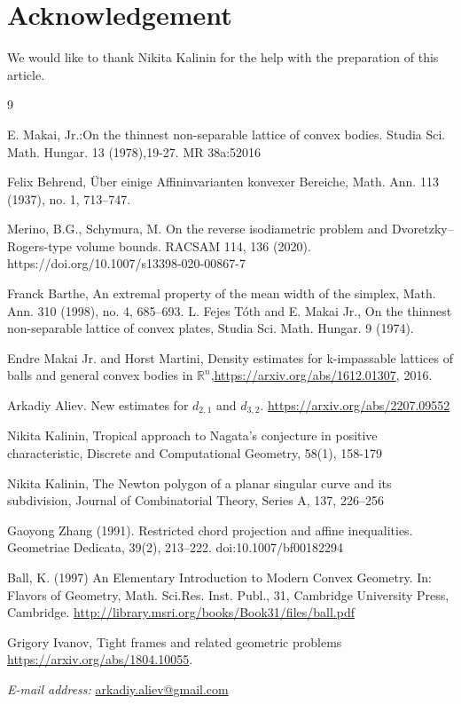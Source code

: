 \documentclass[12pt]{article}
\begin{document}
\section*{Acknowledgement}
\noindent We would like to thank Nikita Kalinin for the help with the preparation of this article.

\begin{thebibliography}{9}

E. Makai, Jr.:On the thinnest non-separable lattice of convex bodies. Studia Sci. Math. Hungar. 13 (1978),19-27. MR 38a:52016


    Felix Behrend, Über einige Affininvarianten konvexer Bereiche, Math. Ann. 113
(1937), no. 1, 713–747.

   
 Merino, B.G., Schymura, M. On the reverse isodiametric problem and Dvoretzky–Rogers-type volume bounds. RACSAM 114, 136 (2020). https://doi.org/10.1007/s13398-020-00867-7


 Franck Barthe, An extremal property of the mean width of the simplex, Math. Ann.
310 (1998), no. 4, 685–693.
     L. Fejes T\'oth and E. Makai Jr., On the thinnest non-separable lattice of convex plates, Studia Sci. Math. Hungar. 9 (1974).

      Endre Makai Jr. and Horst Martini, Density estimates for k-impassable lattices of balls and general convex bodies in $\mathbb{R}^n$,\url{https://arxiv.org/abs/1612.01307}, 2016.

   Arkadiy Aliev. New estimates for $d_{2,1}$ and $d_{3,2}$. \url{https://arxiv.org/abs/2207.09552}

  
   Nikita Kalinin, Tropical approach to Nagata’s conjecture in positive characteristic, Discrete and Computational Geometry, 58(1), 158-179

   Nikita Kalinin, The Newton polygon of a planar singular curve and its subdivision, Journal of
Combinatorial Theory, Series A, 137, 226–256


  Gaoyong Zhang (1991). Restricted chord projection and affine inequalities. Geometriae Dedicata, 39(2), 213–222. doi:10.1007/bf00182294 

    
     Ball, K. (1997) An Elementary Introduction to Modern Convex Geometry. In: Flavors of Geometry, Math. Sci.Res. Inst. Publ., 31, Cambridge University Press, Cambridge. \url{http://library.msri.org/books/Book31/files/ball.pdf}

 

    


    



      
   


  

     Grigory Ivanov, Tight frames and related geometric problems \url{https://arxiv.org/abs/1804.10055}.

   
    

    
    
\end{thebibliography}

\textit{E-mail address:} \href{mailto:arkadiy.aliev@gmail.com}{arkadiy.aliev@gmail.com} 
\end{document}
